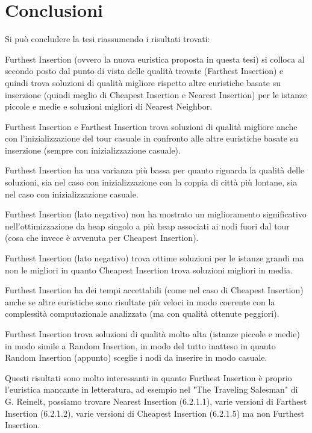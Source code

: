 \documentclass[a4paper,12pt]{report}
\begin{document}
\chapter{Conclusioni}
Si può concludere la tesi riassumendo i risultati trovati:
\begin{legal}
  \item Furthest Insertion (ovvero la nuova euristica proposta in questa tesi) si colloca al secondo posto dal punto di vista delle qualità trovate (Farthest Insertion) e quindi trova soluzioni di qualità migliore rispetto altre euristiche basate su inserzione (quindi meglio di Cheapest Insertion e Nearest Insertion) per le istanze piccole e medie e soluzioni migliori di Nearest Neighbor.
  \item Furthest Insertion e Farthest Insertion trova soluzioni di qualità migliore anche con l'inizializzazione del tour casuale in confronto alle altre euristiche basate su inserzione (sempre con inizializzazione casuale).
  \item Furthest Insertion ha una varianza più bassa per quanto riguarda la qualità delle soluzioni, sia nel caso con inizializzazione con la coppia di città più lontane, sia nel caso con inizializzazione casuale.
  \item Furthest Insertion (lato negativo) non ha mostrato un miglioramento significativo nell'ottimizzazione da heap singolo a più heap associati ai nodi fuori dal tour (cosa che invece è avvenuta per Cheapest Insertion).
  \item Furthest Insertion (lato negativo) trova ottime soluzioni per le istanze grandi ma non le migliori in quanto Cheapest Insertion trova soluzioni migliori in media.
  \item Furthest Insertion ha dei tempi accettabili (come nel caso di Cheapest Insertion) anche se altre euristiche sono risultate più veloci in modo coerente con la complessità computazionale analizzata (ma con qualità ottenute peggiori).
  \item Furthest Insertion trova soluzioni di qualità molto alta (istanze piccole e medie) in modo simile a Random Insertion, in modo del tutto inatteso in quanto Random Insertion (appunto) sceglie i nodi da inserire in modo casuale.
\end{legal}
Questi risultati sono molto interessanti in quanto Furthest Insertion è proprio l'euristica mancante in letteratura, ad esempio nel "The Traveling Salesman" di G. Reinelt\cite{Reinelt}, possiamo trovare Nearest Insertion (6.2.1.1), varie versioni di Farthest Insertion (6.2.1.2), varie versioni di Cheapest Insertion (6.2.1.5) ma non Furthest Insertion.
\end{document}

